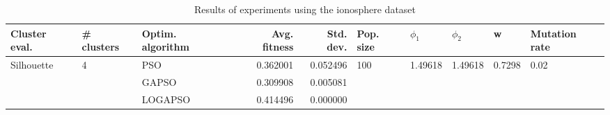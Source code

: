 \begin{table}
\centering
\caption{Results of experiments using the ionosphere dataset}
\begin{tabular}{lllrrlllll}
\toprule
              Cluster eval. &        \# clusters & Optim. algorithm &  Avg. fitness &  Std. dev. &            Pop. size &               $\phi_{1}$ &               $\phi_{2}$ &                       w &         Mutation rate \\
\midrule
\multirow{3}{*}{Silhouette} & \multirow{3}{*}{4} &              PSO &      0.362001 &   0.052496 & \multirow{3}{*}{100} & \multirow{3}{*}{1.49618} & \multirow{3}{*}{1.49618} & \multirow{3}{*}{0.7298} & \multirow{3}{*}{0.02} \\
                            &                    &            GAPSO &      0.309908 &   0.005081 &                      &                          &                          &                         &                       \\
                            &                    &          LOGAPSO &      0.414496 &   0.000000 &                      &                          &                          &                         &                       \\
\bottomrule
\end{tabular}
\end{table}
